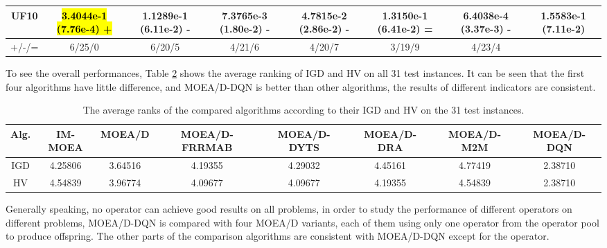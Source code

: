 \documentclass[journal]{IEEEtran}
\begin{document}
\begin{table}[tbp]
{\begin{tabular}{cccccccc}
      UF10    & \hl{3.4044e-1 (7.76e-4) +} & 1.1289e-1 (6.11e-2) -      & 7.3765e-3 (1.80e-2) -      & 4.7815e-2 (2.86e-2) -      & 1.3150e-1 (6.41e-2) =      & 6.4038e-4 (3.37e-3) -      & 1.5583e-1 (7.11e-2)      \\
      \hline
      +/-/=   & 6/25/0                     & 6/20/5                     & 4/21/6                     & 4/20/7                     & 3/19/9                     & 4/23/4                     &                          \\
      \bottomrule
    \end{tabular}
  }
  \label{tab:hv_all}
\end{table}

To see the overall performances, Table \ref{tab:rank_all} shows the average ranking of IGD and HV on all 31 test instances.
It can be seen that the first four algorithms have little difference, and MOEA/D-DQN is better than other algorithms, the results of different indicators are consistent.


\begin{table}[tbp]
  \renewcommand{\arraystretch}{1.2}  %
  \centering
  \caption{The average ranks of the compared algorithms according to their IGD and HV on the 31 test instances.}
  \begin{tabular}{cccccccc}
    \toprule
    Alg. & IM-MOEA & MOEA/D  & MOEA/D-FRRMAB & MOEA/D-DYTS & MOEA/D-DRA & MOEA/D-M2M & MOEA/D-DQN \\
    \midrule
    IGD  & 4.25806 & 3.64516 & 4.19355       & 4.29032     & 4.45161    & 4.77419    & 2.38710    \\
    HV   & 4.54839 & 3.96774 & 4.09677       & 4.09677     & 4.19355    & 4.54839    & 2.38710    \\
    \bottomrule
  \end{tabular}
  \label{tab:rank_all}
\end{table}

Generally speaking, no operator can achieve good results on all problems, in order to study the performance of different operators on different problems, MOEA/D-DQN is compared with four MOEA/D variants, each of them using only one operator from the operator pool to produce offspring. The other parts of the comparison algorithms are consistent with MOEA/D-DQN except for the operator.
\end{document}
